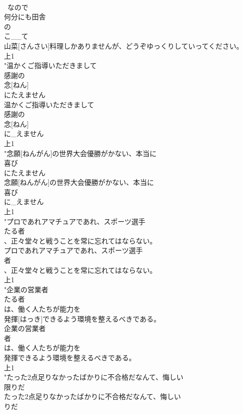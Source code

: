 \documentclass[8pt]{extreport}
\begin{document}
\begin{CJK}{UTF8}{min}
\\	~なので	
\\	何分にも田舎
\\	の
\\	こ__て
\\	山菜[さんさい]料理しかありませんが、どうぞゆっくりしていってください。
\\	上1
\\	"温かくご指導いただきまして
\\	感謝の
\\	念[ねん]
\\	にたえません
\\	温かくご指導いただきまして
\\	感謝の
\\	念[ねん]
\\	に_えません
\\	上1
\\	"念願[ねんがん]の世界大会優勝がかない、本当に
\\	喜び
\\	にたえません
\\	念願[ねんがん]の世界大会優勝がかない、本当に
\\	喜び
\\	に_えません
\\	上1
\\	"プロであれアマチュアであれ、スポーツ選手
\\	たる者
\\	、正々堂々と戦うことを常に忘れてはならない。
\\	プロであれアマチュアであれ、スポーツ選手
\\	者
\\	、正々堂々と戦うことを常に忘れてはならない。
\\	上1
\\	"企業の営業者
\\	たる者
\\	は、働く人たちが能力を
\\	発揮[はっき]できるよう環境を整えるべきである。
\\	企業の営業者
\\	者
\\	は、働く人たちが能力を
\\	発揮できるよう環境を整えるべきである。
\\	上1
\\	"たった2点足りなかったばかりに不合格だなんて、悔しい
\\	限りだ
\\	たった2点足りなかったばかりに不合格だなんて、悔しい
\\	りだ

\end{CJK}
\end{document}
